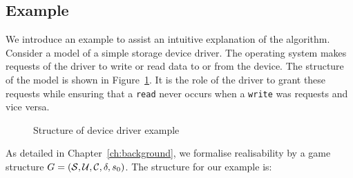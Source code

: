 
\subsection{Example}
\label{sec:boundedexample}

We introduce an example to assist an intuitive explanation of the algorithm. Consider a model of a simple storage device driver. The operating system makes requests of the driver to write or read data to or from the device. The structure of the model is shown in Figure~\ref{fig:exampleStructural}. It is the role of the driver to grant these requests while ensuring that a \texttt{read} never occurs when a \texttt{write} was requests and vice versa.

\begin{figure}
    \centering
    \caption{Structure of device driver example}
    \label{fig:exampleStructural}
\end{figure}

As detailed in Chapter~\ref{ch:background}, we formalise realisability by a game structure $G = (\mathcal{S}, \mathcal{U}, \mathcal{C}, \delta, s_0)$. The structure for our example is:

